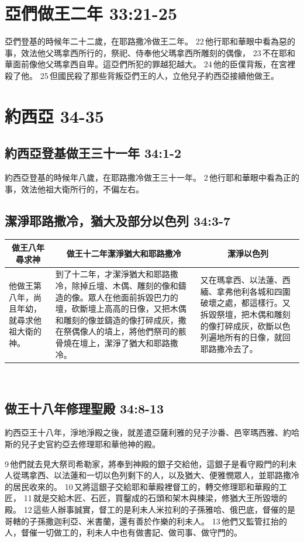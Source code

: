 \section{亞們做王二年 33:21-25 }
亞們登基的時候年二十二歲，在耶路撒冷做王二年。 22 他行耶和華眼中看為惡的事，效法他父瑪拿西所行的，祭祀、侍奉他父瑪拿西所雕刻的偶像， 23 不在耶和華面前像他父瑪拿西自卑。這亞們所犯的罪越犯越大。 24 他的臣僕背叛，在宮裡殺了他。 25 但國民殺了那些背叛亞們王的人，立他兒子約西亞接續他做王。

\section{約西亞 34-35 }
\subsection{約西亞登基做王三十一年 34:1-2}
約西亞登基的時候年八歲，在耶路撒冷做王三十一年。 2 他行耶和華眼中看為正的事，效法他祖大衛所行的，不偏左右。

\subsection{潔淨耶路撒冷，猶大及部分以色列 34:3-7}
\begin{table}[H]
\centering
\begin{tabular}{p{2.5cm}|p{8.75cm}|p{5.25cm}}\hline\hline
\multicolumn{1}{c|}{做王八年尋求神}&\multicolumn{1}{c|}{做王十二年潔淨猶大和耶路撒冷}&\multicolumn{1}{c}{潔淨以色列}\\\hline
他做王第八年，尚且年幼，就尋求他祖大衛的神。
&到了十二年，才潔淨猶大和耶路撒冷，除掉丘壇、木偶、雕刻的像和鑄造的像。眾人在他面前拆毀巴力的壇，砍斷壇上高高的日像，又把木偶和雕刻的像並鑄造的像打碎成灰，撒在祭偶像人的墳上，將他們祭司的骸骨燒在壇上，潔淨了猶大和耶路撒冷。
&又在瑪拿西、以法蓮、西緬、拿弗他利各城和四圍破壞之處，都這樣行。又拆毀祭壇，把木偶和雕刻的像打碎成灰，砍斷以色列遍地所有的日像，就回耶路撒冷去了。\\\hline 
\end{tabular}
\end{table} 


\subsection{做王十八年修理聖殿 34:8-13}
約西亞王十八年，淨地淨殿之後，就差遣亞薩利雅的兒子沙番、邑宰瑪西雅、約哈斯的兒子史官約亞去修理耶和華他神的殿。 

9 他們就去見大祭司希勒家，將奉到神殿的銀子交給他，這銀子是看守殿門的利未人從瑪拿西、以法蓮和一切以色列剩下的人，以及猶大、便雅憫眾人，並耶路撒冷的居民收來的。 
10 又將這銀子交給耶和華殿裡督工的，轉交修理耶和華殿的工匠， 11 就是交給木匠、石匠，買鑿成的石頭和架木與棟梁，修猶大王所毀壞的殿。 12 這些人辦事誠實，督工的是利未人米拉利的子孫雅哈、俄巴底，督催的是哥轄的子孫撒迦利亞、米書蘭，還有善於作樂的利未人。 13 他們又監管扛抬的人，督催一切做工的，利未人中也有做書記、做司事、做守門的。

